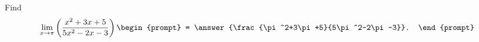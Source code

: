 \documentclass{ximera}
\author{Gregory Hartman \and Matthew Carr}
\begin{document}
\begin{exercise}




Find 
\[
\lim_{x\to\pi}\p{\frac{x^2+3x+5}{5x^2-2x-3}}
\begin{prompt}
= \answer{\frac{\pi^2+3\pi+5}{5\pi^2-2\pi-3}}.
\end{prompt}
\]

\end{exercise}
\end{document}
